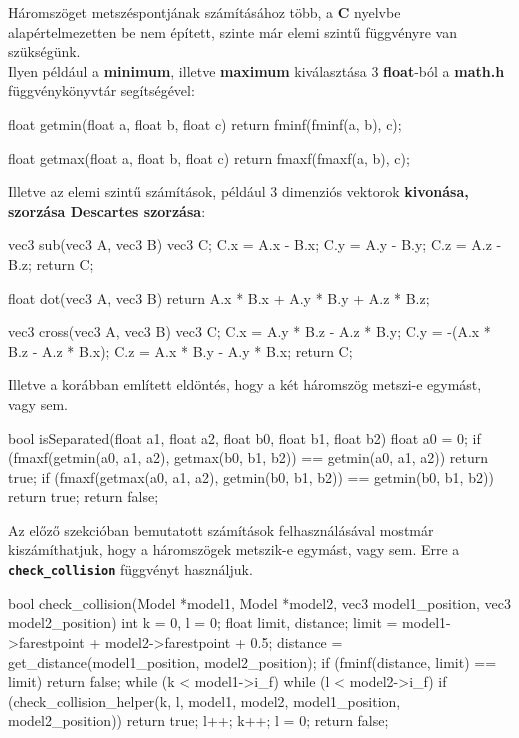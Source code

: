 Háromszöget metszéspontjának számításához több, a \textbf{C} nyelvbe alapértelmezetten be nem épített, szinte már elemi szintű függvényre van szükségünk. \\
Ilyen például a \textbf{minimum}, illetve \textbf{maximum} kiválasztása 3 \textbf{float}-ból a \textbf{math.h} függvénykönyvtár segítségével:

\begin{cpp}
float getmin(float a, float b, float c)
{
    return fminf(fminf(a, b), c);
}

float getmax(float a, float b, float c)
{
    return fmaxf(fmaxf(a, b), c);
}
\end{cpp}

Illetve az elemi szintű számítások, például 3 dimenziós vektorok \textbf{kivonása, szorzása Descartes szorzása}:

\begin{cpp}
vec3 sub(vec3 A, vec3 B)
{
    vec3 C;
    C.x = A.x - B.x;
    C.y = A.y - B.y;
    C.z = A.z - B.z;
    return C;
}
	
float dot(vec3 A, vec3 B)
{
    return A.x * B.x + A.y * B.y + A.z * B.z;
}
\end{cpp}
\newpage
\begin{cpp}
vec3 cross(vec3 A, vec3 B)
{
    vec3 C;
    C.x = A.y * B.z - A.z * B.y;
    C.y = -(A.x * B.z - A.z * B.x);
    C.z = A.x * B.y - A.y * B.x;
    return C;
}
\end{cpp}

Illetve a korábban említett eldöntés, hogy a két háromszög metszi-e egymást, vagy sem.

\begin{cpp}
bool isSeparated(float a1, float a2, float b0, float b1, float b2)
{
    float a0 = 0;
    if (fmaxf(getmin(a0, a1, a2), getmax(b0, b1, b2)) 
    == getmin(a0, a1, a2))
    {
        return true;
    }
    if (fmaxf(getmax(a0, a1, a2), getmin(b0, b1, b2)) 
    == getmin(b0, b1, b2))
    {
        return true;
    }
    return false;
}
\end{cpp}
\newpage
{}

Az előző szekcióban bemutatott számítások felhasználásával mostmár kiszámíthatjuk, hogy a háromszögek metszik-e egymást, vagy sem. Erre a \textbf{\texttt{check\_collision}} függvényt használjuk.

\begin{cpp}
bool check_collision(Model *model1, Model *model2, vec3 model1_position,
vec3 model2_position)
{
    int k = 0, l = 0;
    float limit, distance;
    limit = model1->farestpoint + model2->farestpoint + 0.5;
    distance = get_distance(model1_position, model2_position);
    if (fminf(distance, limit) == limit)
    {
        return false;
    }
    while (k < model1->i_f)
    {
        while (l < model2->i_f)
        {
            if (check_collision_helper(k, l, model1, model2, 
            model1_position, model2_position))
            {
                return true;
            }
            l++;
        }
        k++;
        l = 0;
    }
return false;
}
\end{cpp}

